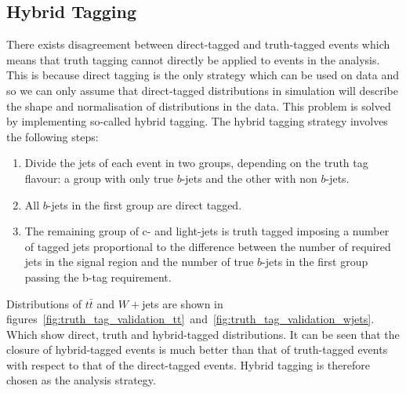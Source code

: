 \subsection{Hybrid Tagging}
\label{subsec:hybrid-tagging}
There exists disagreement between direct-tagged and truth-tagged events which
means that truth tagging cannot directly be applied to events in the analysis.
This is because direct tagging is the only strategy which can be used on data
and so we can only assume that direct-tagged distributions in simulation will
describe the shape and normalisation of distributions in the data. This problem
is solved by implementing so-called hybrid tagging. The hybrid tagging strategy
involves the following steps:
\begin{enumerate}
\item Divide the jets of each event in two groups, depending on the truth tag
  flavour: a group with only true $b$-jets and the other with non $b$-jets.
  
\item All $b$-jets in the first group are direct tagged.
  
\item  The remaining group of c- and light-jets is truth tagged imposing a
  number of tagged jets proportional to the difference between the number of
  required jets in the signal region and the number of true $b$-jets in the first
  group passing the b-tag requirement.
\end{enumerate}
Distributions of $t\bar{t}$ and $W+$jets are shown in
figures~\ref{fig:truth_tag_validation_tt}~and~\ref{fig:truth_tag_validation_wjets}.
Which show direct, truth and hybrid-tagged distributions. It can be seen that
the closure of hybrid-tagged events is much better than that of truth-tagged
events with respect to that of the direct-tagged events. Hybrid tagging is
therefore chosen as the analysis strategy.


\clearpage
\newpage
